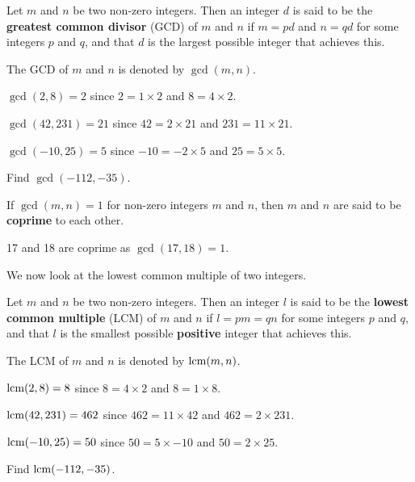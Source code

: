 \begin{definition}
    Let $m$ and $n$ be two non-zero integers. Then an integer $d$ is said to be the \textbf{greatest common divisor} (GCD) of $m$ and $n$ if $m = pd$ and $n = qd$ for some integers $p$ and $q$, and that $d$ is the largest possible integer that achieves this.
\end{definition}
The GCD of $m$ and $n$ is denoted by $\gcd(m, n)$.

\begin{example}
    $\gcd(2, 8) = 2$ since $2 = 1 \times 2$ and $8 = 4 \times 2$.
\end{example}
\begin{example}
    $\gcd(42, 231) = 21$ since $42 = 2 \times 21$ and $231 = 11 \times 21$.
\end{example}
\begin{example}
    $\gcd(-10, 25) = 5$ since $-10 = -2 \times 5$ and $25 = 5 \times 5$.
\end{example}
\begin{exercise}
    Find $\gcd(-112, -35)$.
\end{exercise}

\begin{remark}
    If $\gcd(m, n) = 1$ for non-zero integers $m$ and $n$, then $m$ and $n$ are said to be \textbf{coprime} to each other.
\end{remark}
\begin{example}
    17 and 18 are coprime as $\gcd(17, 18) = 1$.
\end{example}

We now look at the lowest common multiple of two integers.
\begin{definition}
    Let $m$ and $n$ be two non-zero integers. Then an integer $l$ is said to be the \textbf{lowest common multiple} (LCM) of $m$ and $n$ if $l = pm = qn$ for some integers $p$ and $q$, and that $l$ is the smallest possible \textbf{positive} integer that achieves this.
\end{definition}
The LCM of $m$ and $n$ is denoted by $\mathrm{lcm}(m,n)$.

\begin{example}
    $\mathrm{lcm}(2, 8) = 8$ since $8 = 4 \times 2$ and $8 = 1 \times 8$.
\end{example}
\begin{example}
    $\mathrm{lcm}(42, 231) = 462$ since $462 = 11 \times 42$ and $462 = 2 \times 231$.
\end{example}
\begin{example}
    $\mathrm{lcm}(-10, 25) = 50$ since $50 = 5 \times -10$ and $50 = 2 \times 25$.
\end{example}
\begin{exercise}
    Find $\mathrm{lcm}(-112, -35)$.
\end{exercise}

